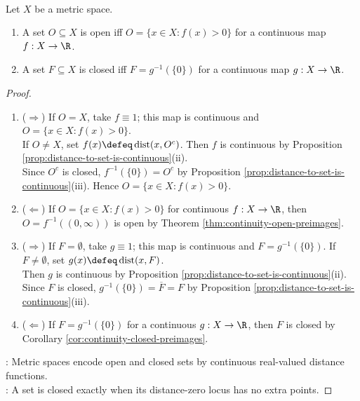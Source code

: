 \begin{corollary} \label{cor:open-closed-sets-by-continuous-real-functions} \\
Let $X$ be a metric space.
\begin{enumerate}[label=(\roman*)]
\setlength{\itemsep}{0pt}
\item A set $O\subseteq X$ is open iff $O=\{x\in X:f(x)>0\}$ for a continuous map $f:X\to\R$.
\item A set $F\subseteq X$ is closed iff $F=g^{-1}(\{0\})$ for a continuous map $g:X\to\R$.
\end{enumerate}
\begin{proof}
\begin{enumerate}[label=(\roman*)]
\setlength{\itemsep}{0pt}
\item[$(i)$] ($\Rightarrow$) If $O=X$, take $f\equiv1$; this map is continuous and $O=\{x\in X:f(x)>0\}$.\\
If $O\neq X$, set $f(x)\defeq\operatorname{dist}(x,O^c)$. Then $f$ is continuous by Proposition \ref{prop:distance-to-set-is-continuous}(ii).\\
Since $O^c$ is closed, $f^{-1}(\{0\})=O^c$ by Proposition \ref{prop:distance-to-set-is-continuous}(iii). Hence $O=\{x\in X:f(x)>0\}$.
\item[$(i)$] ($\Leftarrow$) If $O=\{x\in X:f(x)>0\}$ for continuous $f:X\to\R$, then $O=f^{-1}((0,\infty))$ is open by Theorem \ref{thm:continuity-open-preimages}.
\item[$(ii)$] ($\Rightarrow$) If $F=\emptyset$, take $g\equiv1$; this map is continuous and $F=g^{-1}(\{0\})$. If $F\neq\emptyset$, set $g(x)\defeq\operatorname{dist}(x,F)$.\\
Then $g$ is continuous by Proposition \ref{prop:distance-to-set-is-continuous}(ii). Since $F$ is closed, $g^{-1}(\{0\})=\overline{F}=F$ by Proposition \ref{prop:distance-to-set-is-continuous}(iii).
\item[$(ii)$] ($\Leftarrow$) If $F=g^{-1}(\{0\})$ for a continuous $g:X\to\R$, then $F$ is closed by Corollary \ref{cor:continuity-closed-preimages}.
\end{enumerate}
: Metric spaces encode open and closed sets by continuous real-valued distance functions.\\
: A set is closed exactly when its distance-zero locus has no extra points.
\end{proof}
\end{corollary}

